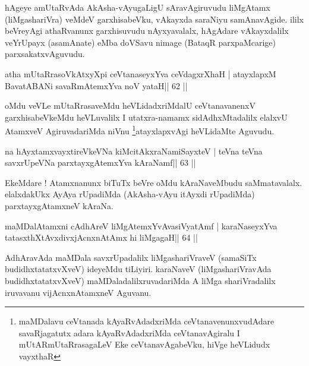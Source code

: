 \begin{artha}
hAgeye amUtaRvAda AkAsha-vAyugaLigU sAravAgiruvudu liMgAtamx (liMgashariVra) veMdeV garxhisabeVku, vAkayxda saraNiyu samAnavAgide. ililx beVreyAgi athaRvanunx garxhisuvudu nAyxyavalalx, hAgAdare vAkayxdalilx veYrUpayx (asamAnate) eMba doVSavu nimage (BataqR parxpaMcarige) parxsakatxvAguvudu.
\end{artha}



\begin{shl}
atha mUtaRrasoVkAtxyX\s pi ceVtanaseyxYva ceVdagxrXhaH |
atayxlapxM BavatA\s BANi savaRmAtemxYva noV yataH\hfill || 62 ||
\end{shl}

\begin{artha}
oMdu veVLe mUtaRrasaveMdu heVLidadxriMdalU ceVtanavanenxV
garxhisabeVkeMdu heVLuvalilx I utatxra-namamx sidAdhxMtadalilx elalxvU
AtamxveV AgiruvadariMda niVnu \footnote{maMDalavu ceVtanada
kAyaRvAdadxriMda ceVtanavenunxvudAdare savaRjagatutx adara
kAyaRvAdadxriMda ceVtanavAgiralu I mUtARmUtaRrasagaLeV
Eke ceVtanavAgabeVku, hiVge heVLidudx vayxthaR}atayxlapxvAgi heVLidaMte
Aguvudu.
\end{artha}



\begin{shl}
na hAyxtamxvayxtireVkeVNa kiMcitAkxraNamiSayxteV |
teVna teVna savxrUpeVNa parxtayxgAtemxYva kAraNamf\hfill || 63 ||
\end{shl}

\begin{artha}
EkeMdare ! Atamxnanunx biTuTx beVre oMdu kAraNaveMbudu saMmatavalalx. elalxdakUkx AyAya rUpadiMda (AkAsha-vAyu itAyxdi rUpadiMda) parxtayxgAtamxneV kAraNa.
\end{artha}



\begin{shl}
maMDalAtamxni cA\s\s dhAreV liMgAtemxYvAvasiVyatAmf |
karaNaseyxYva tatasxthXtAvxdivxjAcnxnAtAmx hi liMgagaH\hfill || 64 ||
\end{shl}

\begin{artha}
AdhAravAda maMDala savxrUpadalilx liMgashariVraveV (samaSiTx
budidhxtatatxvXveV) ideyeMdu tiLiyiri. karaNaveV (liMgashariVravAda
budidhxtatatxvXveV) maMDaladalilxruvadariMda A liMga shariVradalilx
iruvavanu vijAcnxnAtamxneV Aguvanu.
\end{artha}


